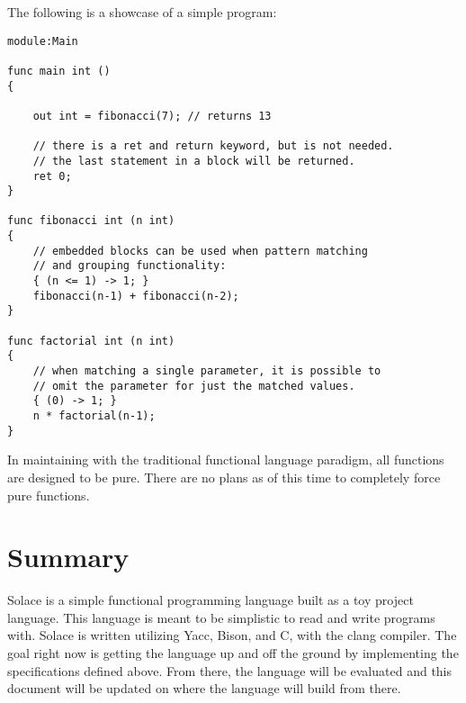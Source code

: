 \documentclass{article}
\begin{document}
The following is a showcase of a simple program:
\begin{lstlisting}
module:Main

func main int ()
{
	
	out int = fibonacci(7); // returns 13
	
	// there is a ret and return keyword, but is not needed.
	// the last statement in a block will be returned.
	ret 0;
}

func fibonacci int (n int)
{
	// embedded blocks can be used when pattern matching
	// and grouping functionality:
	{ (n <= 1) -> 1; }
	fibonacci(n-1) + fibonacci(n-2);
}

func factorial int (n int)
{
	// when matching a single parameter, it is possible to
	// omit the parameter for just the matched values.
	{ (0) -> 1; }
	n * factorial(n-1);
}
\end{lstlisting}

In maintaining with the traditional functional language paradigm, all functions are
designed to be pure. There are no plans as of this time to completely force pure functions.

\section{Summary}
Solace is a simple functional programming language built as a toy project language.
This language is meant to be simplistic to read and write programs with. Solace is written 
utilizing Yacc, Bison, and C, with the clang compiler.
The goal right now is getting the language up and off the ground by implementing the
specifications defined above. From there, the language will be evaluated and this document
will be updated on where the language will build from there.
\end{document}
